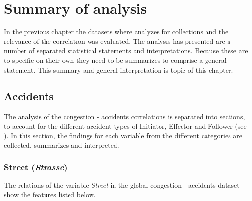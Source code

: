 \chapter{Summary of analysis}
\label{analysis_summary}
In the previous chapter the datasets where analyzes for collections and the relevance of the correlation was evaluated. The analysis has presented are a number of separated statistical statements and interpretations. Because these are to specific on their own they need to be summarizes to comprise a general statement. This summary and general interpretation is topic of this chapter.

\section{Accidents}
The analysis of the congestion -  accidents correlations is separated into sections, to account for the different accident types of Initiator, Effector and Follower (see \label{methodology_data_processing}). In this section, the findings for each variable from the different categories are collected, summarizes and interpreted. 

\subsection{Street (\textit{Strasse})}
\label{analysis_sum_Strasse}
The relations of the variable \textit{Street} in the global congestion -  accidents dataset show the features listed below.


